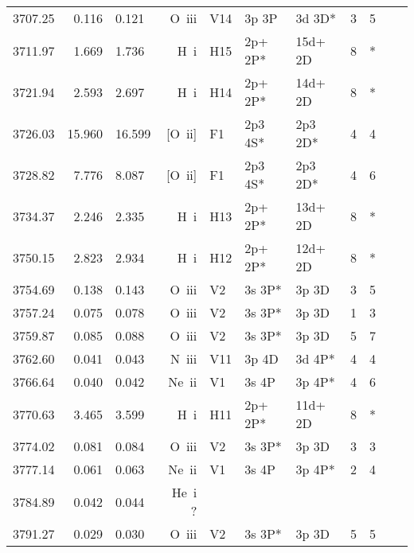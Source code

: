 \begin{longtable}{lrlrlllllll}
 3707.25 &   0.116 &   0.121 &  O~{\sc iii}     &  V14       &  3p 3P     &  3d 3D*    &          3 &        5    \\
 3711.97 &   1.669 &   1.736 &  H~{\sc i}       &  H15       &  2p+ 2P*   &  15d+ 2D   &          8 &        *    \\
 3721.94 &   2.593 &   2.697 &  H~{\sc i}       &  H14       &  2p+ 2P*   &  14d+ 2D   &          8 &        *    \\
 3726.03 &  15.960 &  16.599 &  [O~{\sc ii}]    &  F1        &  2p3 4S*   &  2p3 2D*   &          4 &        4    \\
 3728.82 &   7.776 &   8.087 &  [O~{\sc ii}]    &  F1        &  2p3 4S*   &  2p3 2D*   &          4 &        6    \\
 3734.37 &   2.246 &   2.335 &  H~{\sc i}       &  H13       &  2p+ 2P*   &  13d+ 2D   &          8 &        *    \\
 3750.15 &   2.823 &   2.934 &  H~{\sc i}       &  H12       &  2p+ 2P*   &  12d+ 2D   &          8 &        *    \\
 3754.69 &   0.138 &   0.143 &  O~{\sc iii}     &  V2        &  3s 3P*    &  3p 3D     &          3 &        5    \\
 3757.24 &   0.075 &   0.078 &  O~{\sc iii}     &  V2        &  3s 3P*    &  3p 3D     &          1 &        3    \\
 3759.87 &   0.085 &   0.088 &  O~{\sc iii}     &  V2        &  3s 3P*    &  3p 3D     &          5 &        7    \\
 3762.60 &   0.041 &   0.043 &  N~{\sc iii}     &  V11       &  3p 4D     &  3d 4P*    &          4 &        4    \\
 3766.64 &   0.040 &   0.042 &  Ne~{\sc ii}     &  V1        &  3s 4P     &  3p 4P*    &          4 &        6    \\
 3770.63 &   3.465 &   3.599 &  H~{\sc i}       &  H11       &  2p+ 2P*   &  11d+ 2D   &          8 &        *    \\
 3774.02 &   0.081 &   0.084 &  O~{\sc iii}     &  V2        &  3s 3P*    &  3p 3D     &          3 &        3    \\
 3777.14 &   0.061 &   0.063 &  Ne~{\sc ii}     &  V1        &  3s 4P     &  3p 4P*    &          2 &        4    \\
 3784.89 &   0.042 &   0.044 &  He~{\sc i} ?    &            &            &            &            &             \\
 3791.27 &   0.029 &   0.030 &  O~{\sc iii}     &  V2        &  3s 3P*    &  3p 3D     &          5 &        5    \\

\end{longtable}
